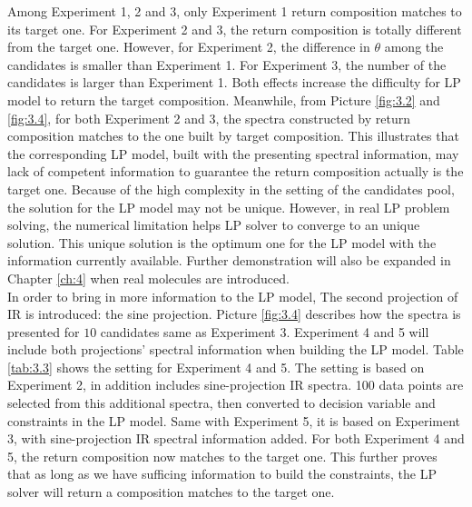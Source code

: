Among Experiment 1, 2 and 3, only Experiment 1 return composition matches to its target one. For Experiment 2 and 3, the return composition is totally different from the target one. However, for Experiment 2, the difference in $\theta$ among the candidates is smaller than Experiment 1. For Experiment 3, the number of the candidates is larger than Experiment 1. Both effects increase the difficulty for LP model to return the target composition. Meanwhile, from Picture \ref{fig:3.2} and \ref{fig:3.4}, for both Experiment 2 and 3, the spectra constructed by return composition matches to the one built by target composition. This illustrates that the corresponding LP model, built with the presenting spectral information, may lack of competent information to guarantee the return composition actually  is the target one. Because of the high complexity in the setting of the candidates pool, the solution for the LP model may not be unique. However, in real LP problem solving, the numerical limitation helps LP solver to converge to an unique solution. This unique solution is the optimum one for the LP model with the information currently available. Further demonstration will also be expanded in Chapter \ref{ch:4} when real molecules are introduced. \\ %

In order to bring in more information to the LP model, The second projection of IR is introduced: the sine projection. Picture \ref{fig:3.4} describes how the spectra is presented for $10$ candidates same as Experiment 3. Experiment 4 and 5 will include both projections' spectral information when building the LP model. Table \ref{tab:3.3} shows the setting for Experiment 4 and 5. The setting is based on Experiment 2, in addition includes sine-projection IR spectra. 100 data points are selected from this additional spectra, then converted to decision variable and constraints in the LP model. Same with Experiment 5, it is based on Experiment 3, with sine-projection IR spectral information added. For both Experiment 4 and 5, the return composition now matches to the target one. This further proves that as long as we have sufficing information to build the constraints, the LP solver will return a composition matches to the target one. \\ 


